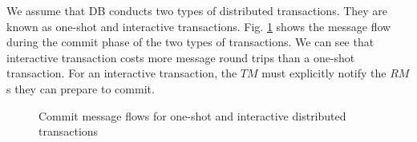 \documentclass[conference]{IEEEtran}
\begin{document}
We assume that DB conducts two types of distributed transactions. They are known as one-shot and interactive transactions.
Fig.    \ref{fig:transaction_type} shows the message flow during the commit phase of the two types of transactions.
We can see that interactive transaction costs more message round trips than a one-shot transaction.
For an interactive transaction, the $ TM $ must explicitly notify the $RM$s they can prepare to commit.

\begin{figure}[tbp]
    \centering

  \caption{Commit message flows for one-shot and interactive distributed transactions}
  \label{fig:transaction_type}
\end{figure}
\end{document}
